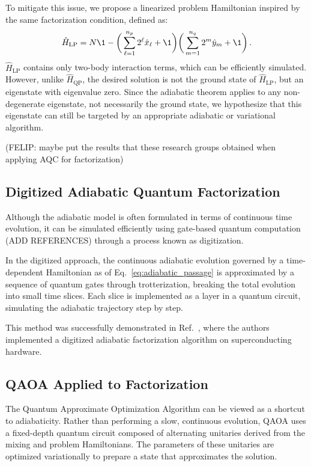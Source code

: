 To mitigate this issue, we propose a linearized problem Hamiltonian
inspired by the same factorization condition, defined as:
\begin{equation}
	\hat{H}_\mathrm{LP} = N \1 - \bigg( \sum_{\ell=1}^{n_p} 2^\ell \hat{x}_\ell + \1 \bigg)
	\bigg( \sum_{m=1}^{n_q} 2^m \hat{y}_m + \1 \bigg)\,.
	\label{eq:linear_problem_hamiltonian}
\end{equation}
$\hat{H}_\mathrm{LP}$ contains only two-body interaction terms, which can be efficiently
simulated. However, unlike $\hat{H}_\mathrm{QP}$, the desired solution is not the ground state of $\hat{H}_\mathrm{LP}$,
but an eigenstate with eigenvalue zero. Since the adiabatic theorem applies to any non-degenerate
eigenstate, not necessarily the ground state, we hypothesize that this eigenstate can still be
targeted by an appropriate adiabatic or variational algorithm.

{\color{red} (FELIP: maybe put the results that these research groups obtained when applying AQC for factorization)}

\subsection{Digitized Adiabatic Quantum Factorization}
Although the adiabatic model is often formulated in terms of continuous time evolution, it
can be simulated efficiently using gate-based quantum computation {\color{red} (ADD REFERENCES)}
through a process known as digitization.

In the digitized approach, the continuous adiabatic evolution governed by a time-dependent
Hamiltonian as of Eq.~\ref{eq:adiabatic_passage} is approximated by a sequence of quantum
gates through trotterization, breaking the total evolution into small time slices. Each slice
is implemented as a layer in a quantum circuit, simulating the adiabatic trajectory step
by step.

This method was successfully demonstrated in Ref.~\cite{hegade_digitized_2021}, where
the authors implemented a digitized adiabatic factorization algorithm on superconducting
hardware.

\subsection{QAOA Applied to Factorization}
The Quantum Approximate Optimization Algorithm can be viewed as a shortcut to adiabaticity.
Rather than performing a slow, continuous evolution, QAOA uses a fixed-depth quantum
circuit composed of alternating unitaries derived from the mixing and problem Hamiltonians.
The parameters of these unitaries are optimized variationally to prepare a state that
approximates the solution.

